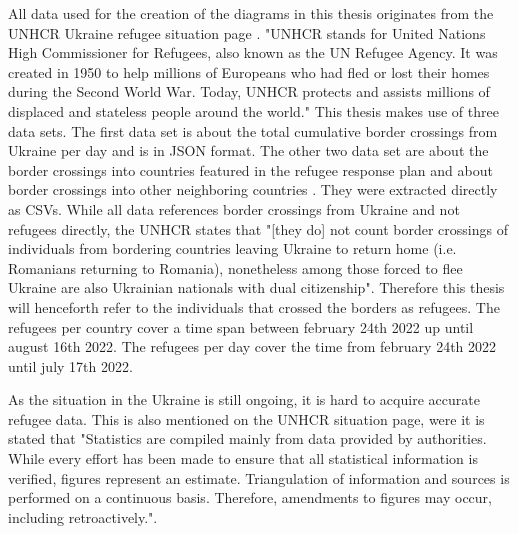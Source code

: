 All data used for the creation of the diagrams in this thesis originates from the UNHCR Ukraine refugee situation page \cite{unhcr}. "UNHCR stands for United Nations High Commissioner for Refugees, also known as the UN Refugee Agency. It was created in 1950 to help millions of Europeans who had fled or lost their homes during the Second World War. Today, UNHCR protects and assists millions of displaced and stateless people around the world."\cite{unhcr_what}
This thesis makes use of three data sets. The first data set is about the total cumulative border crossings from Ukraine per day \cite{unhcr_rpd} and is in JSON format. The other two data set are about the border crossings into countries featured in the refugee response plan and about border crossings into other neighboring countries \cite{unhcr}. They were extracted directly as CSVs. While all data references border crossings from Ukraine and not refugees directly, the UNHCR states that "[they do] not count border crossings of individuals from bordering countries leaving Ukraine to return home (i.e. Romanians returning to Romania), nonetheless among those forced to flee Ukraine are also Ukrainian nationals with dual citizenship"\cite{unhcr_note}. Therefore this thesis will henceforth refer to the individuals that crossed the borders as refugees.
The refugees per country cover a time span between february 24th 2022 up until august 16th 2022\cite{unhcr}. The refugees per day cover the time from february 24th 2022 until july 17th 2022\cite{unhcr_rpd}.

As the situation in the Ukraine is still ongoing, it is hard to acquire accurate refugee data. This is also mentioned on the UNHCR situation page, were it is stated that "Statistics are compiled mainly from data provided by authorities. While every effort has been made to ensure that all statistical information is verified, figures represent an estimate. Triangulation of information and sources is performed on a continuous basis. Therefore, amendments to figures may occur, including retroactively."\cite{unhcr}.


